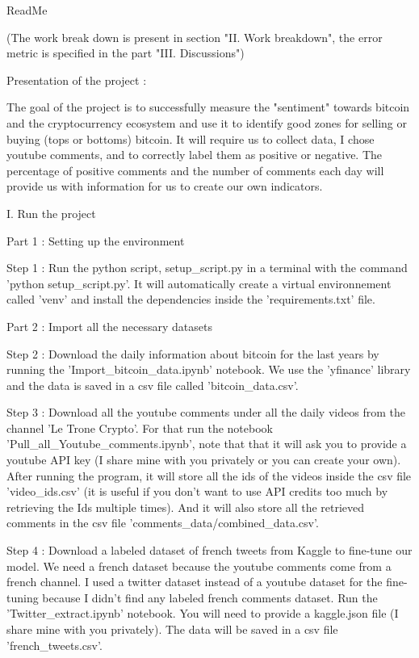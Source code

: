 
ReadMe

(The work break down is present in section "II. Work breakdown", the error metric is specified in the part "III. Discussions")


Presentation of the project : 

The goal of the project is to successfully measure the "sentiment" towards bitcoin and the cryptocurrency ecosystem and use it to identify good 
zones for selling or buying (tops or bottoms) bitcoin. It will require us to collect data, I chose youtube comments, and to correctly label them as positive 
or negative. The percentage of positive comments and the number of comments each day will provide us with information for us to create our own 
indicators.


I. Run the project 

Part 1 : Setting up the environment 

Step 1 : Run the python script, setup_script.py in a terminal with the command 'python setup_script.py'. It will automatically create a virtual
environnement called 'venv' and install the dependencies inside the 'requirements.txt' file.

Part 2 : Import all the necessary datasets 

Step 2 : Download the daily information about bitcoin for the last years by running the 'Import_bitcoin_data.ipynb' notebook. We use the 'yfinance' 
library and the data is saved in a csv file called 'bitcoin_data.csv'.

Step 3 : Download all the youtube comments under all the daily videos from the channel 'Le Trone Crypto'. For that run the notebook 
'Pull_all_Youtube_comments.ipynb', note that that it will ask you to provide a youtube API key (I share mine with you privately or you can create your own).
After running the program, it will store all the ids of the videos inside the csv file 'video_ids.csv' (it is useful if you don't want to use 
API credits too much by retrieving the Ids multiple times). And it will also store all the retrieved comments in the csv file 
'comments_data/combined_data.csv'.

Step 4 : Download a labeled dataset of french tweets from Kaggle to fine-tune our model. We need a french dataset because the youtube comments 
come from a french channel. I used a twitter dataset instead of a youtube dataset for the fine-tuning because I didn't find any labeled french 
comments dataset.
Run the 'Twitter_extract.ipynb' notebook. You will need to provide a kaggle.json file (I share mine with you privately). The data will be saved in
a csv file 'french_tweets.csv'.

